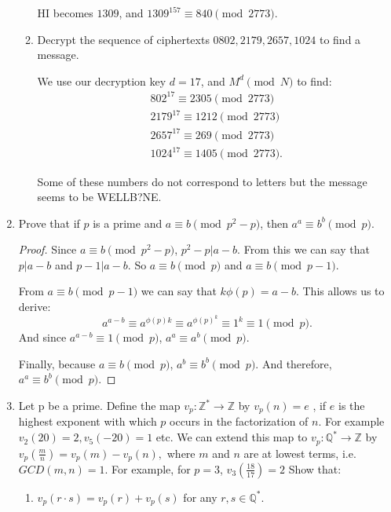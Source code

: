 \documentclass{article}
\begin{document}
\begin{enumerate}
\begin{enumerate}[label= (\alph*)]
            HI becomes $1309$, and $1309^{157}\equiv 840\pmod{2773}$.

        \item Decrypt the sequence of ciphertexts $0802,2179,2657,1024$ to find a message.

            We use our decryption key $d=17$, and $M^{d}\pmod{N}$ to find:
            \begin{align*}
                802^{17}\equiv 2305\pmod{2773}\\
                2179^{17}\equiv 1212\pmod{2773}\\
                2657^{17}\equiv 269\pmod{2773}\\
                1024^{17}\equiv 1405\pmod{2773}
            .\end{align*}

            Some of these numbers do not correspond to letters but the message seems to be 
            WELLB?NE.
            

    \end{enumerate}

\item Prove that if $p$ is a prime and $a\equiv b\pmod{p^2-p}$, then $a^{a}\equiv b^{b}\pmod{p}$.
    \begin{proof} 
        Since $a\equiv b\pmod{p^2-p}$, $p^2-p|a-b$. From this we can say that $p|a-b$ and $p-1|a-b$.
        So $a\equiv b\pmod{p}$ and $a\equiv b\pmod{p-1}$.

        From $a\equiv b\pmod{p-1}$ we can say that $k\phi(p)=a-b$. This allows us to derive:
        \[
            a^{a-b}\equiv a^{\phi(p)k}\equiv a^{\phi(p)^{k}}\equiv 1^{k}\equiv 1\pmod{p}
        .\]  
        And since $a^{a-b}\equiv 1\pmod{p}$, $a^{a}\equiv a^{b}\pmod{p}$.

        Finally, because $a\equiv b\pmod{p}$, $a^{b}\equiv b^{b}\pmod{p}$.
        And therefore, $a^{a}\equiv b^{b}\pmod{p}$.
    \end{proof}

\item Let p be a prime. Define the map $v_p : \mathbb{Z}^{*} \to \mathbb{Z}$ by $v_p(n) = e$
    , if $e$ is the highest exponent
    with which $p$ occurs in the factorization of $n$. For example $v_2(20) = 2, v_5(-20) = 1$
    etc. We can extend this map to $v_p: \mathbb{Q}^* \to \mathbb{Z}$ by 
    $ v_p(\frac{m}{n})=v_p(m)-v_p(n),$
    where $m$ and $n$ are at lowest terms, i.e. $GCD(m, n) = 1$. For example, for $p = 3$, 
    $v_3(\frac{18}{17})=2$
Show that:
\begin{enumerate}[label= (\alph*)] 
    \item $v_p(r \cdot s) = v_p(r) + v_p(s)$ for any $r, s \in \mathbb{Q}^*$.


\end{enumerate}
\end{enumerate}
\end{document}

